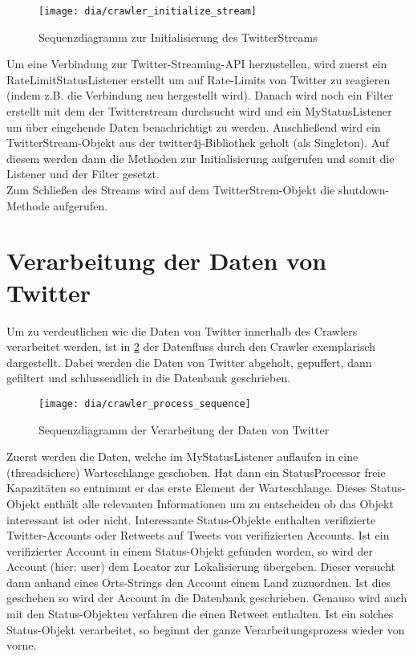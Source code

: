 \begin{figure}[h!]
	\centering
	\texttt{[image: dia/crawler\_initialize\_stream]}
	\caption{Sequenzdiagramm zur Initialisierung des TwitterStreams}
	\label{fig:initialize_stream}
\end{figure}

Um eine Verbindung zur Twitter-Streaming-API herzustellen, wird zuerst ein RateLimitStatusListener erstellt um auf Rate-Limits von Twitter zu reagieren (indem z.B. die Verbindung neu hergestellt wird). Danach wird noch ein Filter erstellt mit dem der Twitterstream durchsucht wird und ein MyStatusListener um über eingehende Daten benachrichtigt zu werden.
Anschließend wird ein TwitterStream-Objekt aus der twitter4j-Bibliothek geholt (als Singleton). Auf diesem werden dann die Methoden zur Initialisierung aufgerufen und somit die Listener und der Filter gesetzt.\\
Zum Schließen des Streams wird auf dem TwitterStrem-Objekt die shutdown-Methode aufgerufen.

\section{Verarbeitung der Daten von Twitter}
Um zu verdeutlichen wie die Daten von Twitter innerhalb des Crawlers verarbeitet werden, ist in \cref{fig:crawler_process} der Datenfluss durch den Crawler exemplarisch dargestellt. Dabei werden die Daten von Twitter abgeholt, gepuffert, dann gefiltert und schlussendlich in die Datenbank geschrieben.

\begin{figure}[h!]
	\centering
	\texttt{[image: dia/crawler\_process\_sequence]}
	\caption{Sequenzdiagramm der Verarbeitung der Daten von Twitter}
	\label{fig:crawler_process}
\end{figure}

Zuerst werden die Daten, welche im MyStatusListener auflaufen in eine (threadsichere) Warteschlange geschoben.
Hat dann ein StatusProcessor freie Kapazitäten so entnimmt er das erste Element der Warteschlange. Dieses Status-Objekt enthält alle relevanten Informationen um zu entscheiden ob das Objekt interessant ist oder nicht.
Interessante Status-Objekte enthalten verifizierte Twitter-Accounts oder Retweets auf Tweets von verifizierten Accounts. Ist ein verifizierter Account in einem Status-Objekt gefunden worden, so wird der Account (hier: user) dem Locator zur Lokalisierung übergeben. Dieser versucht dann anhand eines Orts-Strings den Account einem Land zuzuordnen. Ist dies geschehen so wird der Account in die Datenbank geschrieben. Genauso wird auch mit den Status-Objekten verfahren die einen Retweet enthalten.
Ist ein solches Status-Objekt verarbeitet, so beginnt der ganze Verarbeitungsprozess wieder von vorne.
